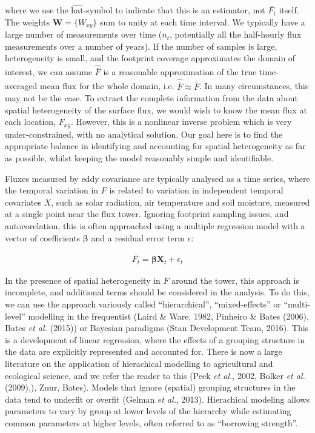 where we use the \(\widehat{\mathrm{hat}}\)-symbol to indicate that this
is an estimator, not \(\bar{F_t}\) itself. The weights
\(\mathbf{W} = \{W_{xy}\}\) sum to unity at each time interval. We
typically have a large number of measurements over time (\(n_t\),
potentially all the half-hourly flux measurements over a number of
years). If the number of samples is large, heterogeneity is small, and
the footprint coverage approximates the domain of interest, we can
assume \(\widehat{\bar{F}}\) is a reasonable approximation of the true
time-averaged mean flux for the whole domain, i.e.
\(\widehat{\bar{F}} \approx \bar{F}\). In many circumstances, this may
not be the case. To extract the complete information from the data about
spatial heterogeneity of the surface flux, we would wish to know the
mean flux at each location, \(\bar{F_{xy}}\). However, this is a
nonlinear inverse problem which is very under-constrained, with no
analytical solution. Our goal here is to find the appropriate balance in
identifying and accounting for spatial heterogeneity as far as possible,
whilst keeping the model reasonably simple and identifiable.

Fluxes measured by eddy covariance are typically analysed as a time
series, where the temporal variation in \(F\) is related to variation in
independent temporal covariates \(X\), such as solar radiation, air
temperature and soil moisture, measured at a single point near the flux
tower. Ignoring footprint sampling issues, and autocorelation, this is
often approached using a multiple regression model with a vector of
coefficients \(\boldsymbol{\beta}\) and a residual error term
\(\epsilon\):

\begin{align}   \label{eq:timeVarn}
  \bar{F_t} = \boldsymbol{\beta} \mathbf{X}_t + \epsilon_{t}
\end{align}

In the presence of spatial heterogeneity in \(F\) around the tower, this
approach is incomplete, and additional terms should be considered in the
analysis. To do this, we can use the approach variously called
``hierarchical'', ``mixed-effects'' or ``multi-level'' modelling in the
frequentist (Laird \& Ware, 1982, Pinheiro \& Bates (2006), Bates
\emph{et al.} (2015)) or Bayesian paradigms (Stan Development Team,
2016). This is a development of linear regression, where the effects of
a grouping structure in the data are explicitly represented and
accounted for. There is now a large literature on the application of
hierachical modelling to agricultural and ecological science, and we
refer the reader to this (Peek \emph{et al.}, 2002, Bolker \emph{et al.}
(2009),), Zuur, Bates). Models that ignore (spatial) grouping structures
in the data tend to underfit or overfit (Gelman \emph{et al.}, 2013).
Hierachical modeling allows parameters to vary by group at lower levels
of the hierarchy while estimating common parameters at higher levels,
often referred to as ``borrowing strength''.

